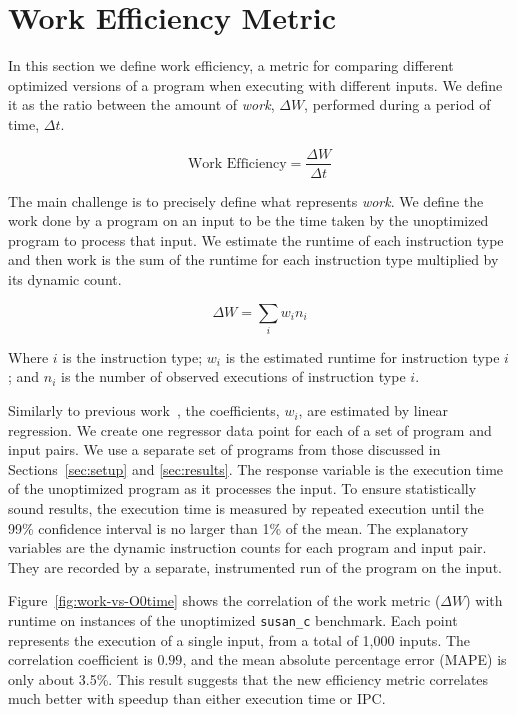 \section{Work Efficiency Metric} \label{sec:metric}

    In this section we define work efficiency, a metric for comparing different optimized versions of a program when executing with
    different inputs. We define it as the ratio between the amount of \textit{work}, $\Delta W$, performed during a period of time, $\Delta
    t$.

    \[
       \textrm{Work Efficiency} = \frac{\Delta W}{\Delta t}
    \]

    The main challenge is to precisely define what represents \textit{work}. We define the work done by a program on an input to be the
    time taken by the unoptimized program to process that input. We estimate the runtime of each instruction type and then work is the sum
    of the runtime for each instruction type multiplied by its dynamic count.

    \[ \Delta W = \sum_i w_i n_i \]

    Where $i$ is the instruction type; $w_i$ is the estimated runtime for instruction type $i$; and $n_i$ is the number of observed
    executions of instruction type $i$.

    Similarly to previous work~\citep{giusto01,powell09,brandolese11}, the coefficients, $w_i$, are estimated by linear regression. We
    create one regressor data point for each of a set of program and input pairs. We use a separate set of programs from those discussed in
    Sections~\ref{sec:setup} and \ref{sec:results}.
    The response variable is the execution time of the unoptimized program as it processes the input. To ensure statistically sound
    results, the execution time is measured by repeated execution until the 99\% confidence interval is no larger than 1\% of the mean. The
    explanatory variables are the dynamic instruction counts for each program and input pair. They are recorded by a separate, instrumented
    run of the program on the input.

    Figure~\ref{fig:work-vs-O0time} shows the correlation of the work metric ($\Delta W$) with runtime on instances of the unoptimized
    \texttt{susan\_c} benchmark. Each point represents the execution of a single input, from a total of 1,000 inputs. The correlation
    coefficient is $0.99$, and the mean absolute percentage error (MAPE) is only about 3.5\%. This result suggests that the new efficiency
    metric correlates much better with speedup than either execution time or IPC.

